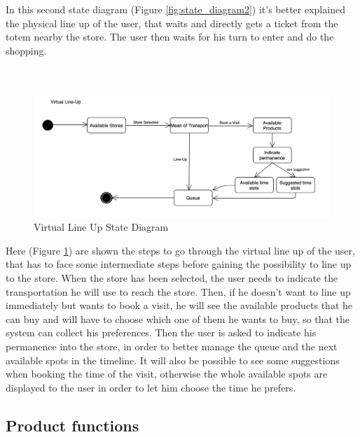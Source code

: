 \documentclass[]{article}
\begin{document}
		
		In this second state diagram (Figure \ref{fig:state_diagram2}) it’s better explained the physical line up of the user, that waits and directly gets a ticket from the totem nearby the store. The user then waits for his turn to enter and do the shopping.\\
		
		\textbf{}\\ \newline
		\textbf{}\\ \newline
		
		\begin{figure}[H]
			\centering
			\includegraphics[width=\linewidth]{VirtualLineUp_statediagram.png}
			\caption{Virtual Line Up State Diagram}
			\label{fig:state_diagram3}
		\end{figure}
		
		Here (Figure \ref{fig:state_diagram3})  are shown the steps to go through the virtual line up of the user, that has to face some intermediate steps before gaining the possibility to line up to the store. When the store has been selected, the user needs to indicate the transportation he will use to reach the store. Then, if he doesn't want to line up immediately but wants to book a visit, he will see the available products that he can buy and will have to choose which one of them he wants to buy, so that the system can collect his preferences. Then the user is asked to indicate his permanence into the store, in order to better manage the queue and the next available spots in the timeline. It will also be possible to see some suggestions when booking the time of the visit, otherwise the whole available spots are displayed to the user in order to let him choose the time he prefers.
		

\newpage

\subsection{Product functions}
\end{document}
